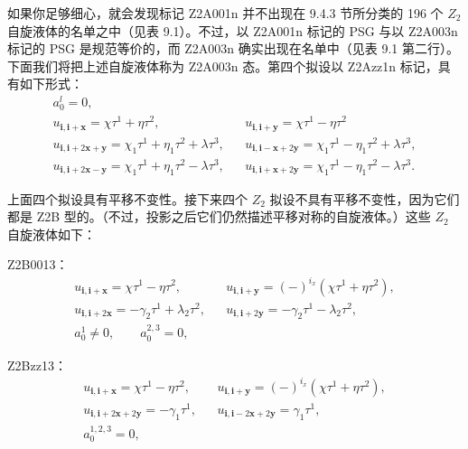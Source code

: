 如果你足够细心，就会发现标记 Z2A001n 并不出现在 9.4.3 节所分类的 196 个 $Z_{2}$ 自旋液体的名单之中（见表 9.1）。不过，以 Z2A001n 标记的 PSG 与以 Z2A003n 标记的 PSG 是规范等价的，而 Z2A003n 确实出现在名单中（见表 9.1 第二行）。下面我们将把上述自旋液体称为 Z2A003n 态。第四个拟设以 Z2Azz1n 标记，具有如下形式：
\begin{equation*}
\begin{array}{rcl}
a_{0}^{l}=0, & & \\[2pt]
u_{\pmb{i},\pmb{i}+\pmb{x}}=\chi\tau^{1}+\eta\tau^{2}, & & u_{\pmb{i},\pmb{i}+\pmb{y}}=\chi\tau^{1}-\eta\tau^{2}\\[2pt]
u_{\pmb{i},\pmb{i}+2\pmb{x}+\pmb{y}}=\chi_{1}\tau^{1}+\eta_{1}\tau^{2}+\lambda\tau^{3}, & & u_{\pmb{i},\pmb{i}-\pmb{x}+2\pmb{y}}=\chi_{1}\tau^{1}-\eta_{1}\tau^{2}+\lambda\tau^{3},\\[2pt]
u_{\pmb{i},\pmb{i}+2\pmb{x}-\pmb{y}}=\chi_{1}\tau^{1}+\eta_{1}\tau^{2}-\lambda\tau^{3}, & & u_{\pmb{i},\pmb{i}+\pmb{x}+2\pmb{y}}=\chi_{1}\tau^{1}-\eta_{1}\tau^{2}-\lambda\tau^{3}.
\end{array}
\tag{9.6.4}
\end{equation*}

上面四个拟设具有平移不变性。接下来四个 $Z_{2}$ 拟设不具有平移不变性，因为它们都是 Z2B 型的。（不过，投影之后它们仍然描述平移对称的自旋液体。）这些 $Z_{2}$ 自旋液体如下：

Z2B0013：
\begin{equation*}
\begin{array}{rcl}
u_{\pmb{i},\pmb{i}+\pmb{x}}=\chi\tau^{1}-\eta\tau^{2}, & & u_{\pmb{i},\pmb{i}+\pmb{y}}=(-)^{i_{x}}(\chi\tau^{1}+\eta\tau^{2}),\\[2pt]
u_{\pmb{i},\pmb{i}+2\pmb{x}}=-\gamma_{2}\tau^{1}+\lambda_{2}\tau^{2}, & & u_{\pmb{i},\pmb{i}+2\pmb{y}}=-\gamma_{2}\tau^{1}-\lambda_{2}\tau^{2},\\[2pt]
a_{0}^{1}\neq0,\qquad a_{0}^{2,3}=0, & &
\end{array}
\tag{9.6.5}
\end{equation*}

Z2Bzz13：
\begin{equation*}
\begin{array}{rcl}
u_{\pmb{i},\pmb{i}+\pmb{x}}=\chi\tau^{1}-\eta\tau^{2}, & & u_{\pmb{i},\pmb{i}+\pmb{y}}=(-)^{i_{x}}(\chi\tau^{1}+\eta\tau^{2}),\\[2pt]
u_{\pmb{i},\pmb{i}+2\pmb{x}+2\pmb{y}}=-\gamma_{1}\tau^{1}, & & u_{\pmb{i},\pmb{i}-2\pmb{x}+2\pmb{y}}=\gamma_{1}\tau^{1},\\[2pt]
a_{0}^{1,2,3}=0, & &
\end{array}
\tag{9.6.6}
\end{equation*}


